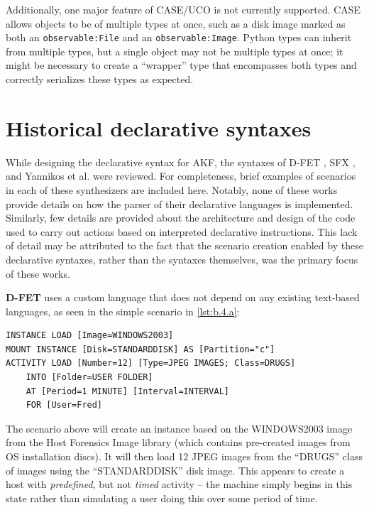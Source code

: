 \documentclass[letterpaper,12pt]{report}
\newcommand{\passthrough}[1]{#1}
\begin{document}
Additionally, one major feature of CASE/UCO is not currently supported.
CASE allows objects to be of multiple types at once, such as a disk
image marked as both an \passthrough{\lstinline!observable:File!} and an
\passthrough{\lstinline!observable:Image!}. Python types can inherit
from multiple types, but a single object may not be multiple types at
once; it might be necessary to create a ``wrapper'' type that
encompasses both types and correctly serializes these types as expected.

\section{Historical declarative
syntaxes}\label{historical-declarative-syntaxes}

While designing the declarative syntax for AKF, the syntaxes of D-FET
\cite{williamCloudbasedDigitalForensics2011}, SFX
\cite{russellForensicImageDescription2012}, and Yannikos et al.
\cite{yannikosDataCorporaDigital2014} were reviewed. For
completeness, brief examples of scenarios in each of these synthesizers
are included here. Notably, none of these works provide details on how
the parser of their declarative languages is implemented. Similarly, few
details are provided about the architecture and design of the code used
to carry out actions based on interpreted declarative instructions. This
lack of detail may be attributed to the fact that the scenario creation
enabled by these declarative syntaxes, rather than the syntaxes
themselves, was the primary focus of these works.

\textbf{D-FET} \cite{williamCloudbasedDigitalForensics2011} uses a
custom language that does not depend on any existing text-based
languages, as seen in the simple scenario in \autoref{lst:b.4.a}:

\begin{lstlisting}[label={lst:b.4.a}, caption={Sample D-FET declarative scenario without events \cite{williamCloudbasedDigitalForensics2011}}, ]
INSTANCE LOAD [Image=WINDOWS2003] 
MOUNT INSTANCE [Disk=STANDARDDISK] AS [Partition="c"] 
ACTIVITY LOAD [Number=12] [Type=JPEG IMAGES; Class=DRUGS] 
    INTO [Folder=USER FOLDER] 
    AT [Period=1 MINUTE] [Interval=INTERVAL] 
    FOR [User=Fred]
\end{lstlisting}

The scenario above will create an instance based on the WINDOWS2003
image from the Host Forensics Image library (which contains pre-created
images from OS installation discs). It will then load 12 JPEG images
from the ``DRUGS'' class of images using the ``STANDARDDISK'' disk
image. This appears to create a host with \emph{predefined}, but not
\emph{timed} activity -- the machine simply begins in this state rather
than simulating a user doing this over some period of time.
\end{document}
